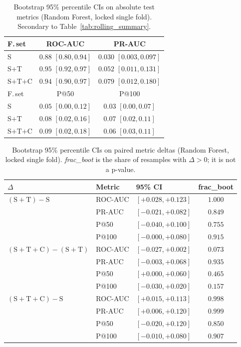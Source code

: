 \documentclass[conference]{IEEEtran}
\begin{document}
\begin{table}[t]
\caption{Bootstrap 95\% percentile CIs on absolute test metrics
(Random Forest, locked single fold). Secondary to
Table~\ref{tab:rolling_summary}.}
\label{tab:boot_abs}
\centering
\small
\begin{tabular}{lcc}
\toprule
F.\,set & ROC-AUC & PR-AUC \\
\midrule
S        & $0.88$ $[0.80, 0.94]$ & $0.030$ $[0.003, 0.097]$ \\
S$+$T    & $0.95$ $[0.92, 0.97]$ & $0.052$ $[0.011, 0.131]$ \\
S$+$T$+$C & $0.94$ $[0.90, 0.97]$ & $0.079$ $[0.012, 0.180]$ \\
\midrule
F.\,set & P@50 & P@100 \\
\midrule
S        & $0.05$ $[0.00, 0.12]$ & $0.03$ $[0.00, 0.07]$ \\
S$+$T    & $0.08$ $[0.02, 0.16]$ & $0.07$ $[0.02, 0.11]$ \\
S$+$T$+$C & $0.09$ $[0.02, 0.18]$ & $0.06$ $[0.03, 0.11]$ \\
\bottomrule
\end{tabular}
\end{table}

\begin{table}[t]
\caption{Bootstrap 95\% percentile CIs on paired metric deltas
(Random Forest, locked single fold). \emph{frac\_boot} is the share
of resamples with $\Delta > 0$; it is not a p-value.}
\label{tab:boot_delta}
\centering
\small
\begin{tabular}{lllc}
\toprule
$\Delta$ & Metric & 95\% CI & frac\_boot \\
\midrule
$(\mathrm{S}{+}\mathrm{T}) - \mathrm{S}$
  & ROC-AUC & $[+0.028, +0.123]$ & $1.000$ \\
  & PR-AUC  & $[-0.021, +0.082]$ & $0.849$ \\
  & P@50    & $[-0.040, +0.100]$ & $0.755$ \\
  & P@100   & $[-0.000, +0.080]$ & $0.915$ \\
\addlinespace
$(\mathrm{S}{+}\mathrm{T}{+}\mathrm{C}) - (\mathrm{S}{+}\mathrm{T})$
  & ROC-AUC & $[-0.027, +0.002]$ & $0.073$ \\
  & PR-AUC  & $[-0.003, +0.068]$ & $0.935$ \\
  & P@50    & $[+0.000, +0.060]$ & $0.465$ \\
  & P@100   & $[-0.030, +0.020]$ & $0.157$ \\
\addlinespace
$(\mathrm{S}{+}\mathrm{T}{+}\mathrm{C}) - \mathrm{S}$
  & ROC-AUC & $[+0.015, +0.113]$ & $0.998$ \\
  & PR-AUC  & $[+0.006, +0.120]$ & $0.999$ \\
  & P@50    & $[-0.020, +0.120]$ & $0.850$ \\
  & P@100   & $[-0.010, +0.080]$ & $0.907$ \\
\bottomrule
\end{tabular}
\end{table}
\end{document}
